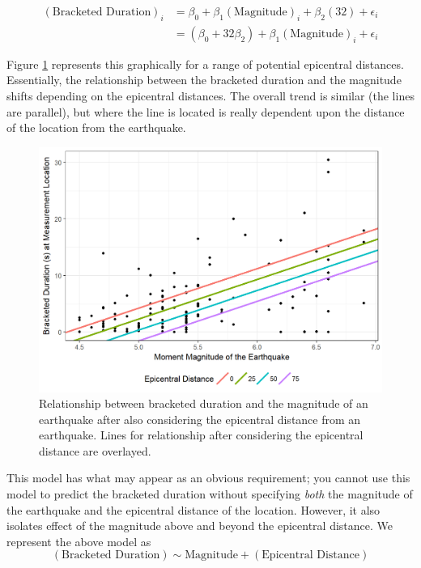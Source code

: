 \documentclass[]{book}
\theoremstyle{definition}
\theoremstyle{definition}
\theoremstyle{definition}
\theoremstyle{remark}
\begin{document}
\[
\begin{aligned}
(\text{Bracketed Duration})_i &= \beta_0 + \beta_1(\text{Magnitude})_i + \beta_2(32) + \epsilon_i \\
  &= \left(\beta_0 + 32\beta_2\right) + \beta_1(\text{Magnitude})_i + \epsilon_i
\end{aligned}
\]

Figure \ref{fig:regmodel-mlr-plot} represents this graphically for a
range of potential epicentral distances. Essentially, the relationship
between the bracketed duration and the magnitude shifts depending on the
epicentral distances. The overall trend is similar (the lines are
parallel), but where the line is located is really dependent upon the
distance of the location from the earthquake.

\begin{figure}

{\centering \includegraphics[width=0.8\linewidth]{./Images/regmodel-mlr-plot-1} 

}

\caption{Relationship between bracketed duration and the magnitude of an earthquake after also considering the epicentral distance from an earthquake.  Lines for relationship after considering the epicentral distance are overlayed.}\label{fig:regmodel-mlr-plot}
\end{figure}

This model has what may appear as an obvious requirement; you cannot use
this model to predict the bracketed duration without specifying
\emph{both} the magnitude of the earthquake and the epicentral distance
of the location. However, it also isolates effect of the magnitude above
and beyond the epicentral distance. We represent the above model as
\[(\text{Bracketed Duration}) \sim \text{Magnitude} + (\text{Epicentral Distance})\]
\end{document}
